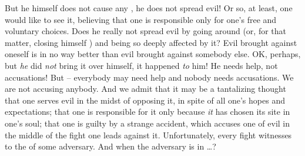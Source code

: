 But he himself does not cause any , he does not spread evil! Or
so, at least, one would like to see it, believing that one is responsible
only for one's free and voluntary choices. Does he really not spread evil by
going around (or, for that matter, closing himself ) and being so
deeply affected by it?
%
Evil brought against oneself is in no way better than evil brought against
somebody else.  OK, perhaps, but {\em he} did {\em not} bring it over himself, it
happened {\em to} him! He needs help, not accusations! But -- everybody may need
help and nobody needs accusations. We are not accusing anybody. And we admit
that it may be a tantalizing thought that one serves evil in the midst of
opposing it, in spite of all one's hopes and expectations; that one is
responsible for it only because {\em it} has chosen its site in one's soul; that
one is guilty by a strange accident, which accuses one of evil in the middle of
the fight one leads against it. Unfortunately, every fight witnesses to the
 of some adversary. And when the adversary is in \ldots?

